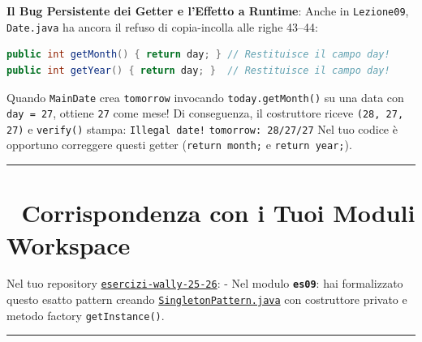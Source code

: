 \documentclass[11pt,a4paper,oneside]{report}
\newcommand{\passthrough}[1]{#1}
\begin{document}
\begin{studywarning} \textbf{Il Bug Persistente dei Getter e l'Effetto a
Runtime}: Anche in \passthrough{\lstinline!Lezione09!},
\passthrough{\lstinline!Date.java!} ha ancora il refuso di copia-incolla
alle righe 43--44:

\begin{lstlisting}[language=Java]
public int getMonth() { return day; } // Restituisce il campo day!
public int getYear() { return day; }  // Restituisce il campo day!
\end{lstlisting}

Quando \passthrough{\lstinline!MainDate!} crea
\passthrough{\lstinline!tomorrow!} invocando
\passthrough{\lstinline!today.getMonth()!} su una data con
\passthrough{\lstinline!day = 27!}, ottiene \passthrough{\lstinline!27!}
come mese! Di conseguenza, il costruttore riceve
\passthrough{\lstinline!(28, 27, 27)!} e
\passthrough{\lstinline!verify()!} stampa:
\passthrough{\lstinline"Illegal date!"}
\passthrough{\lstinline!tomorrow: 28/27/27!} Nel tuo codice è opportuno
correggere questi getter (\passthrough{\lstinline!return month;!} e
\passthrough{\lstinline!return year;!}).
\end{studywarning}

\begin{center}\rule{0.5\linewidth}{0.5pt}\end{center}

\section{🔄 Corrispondenza con i Tuoi Moduli
Workspace}\label{chap08_corrispondenza-con-i-tuoi-moduli-workspace}

Nel tuo repository
\href{file:///home/wally/Documenti/GitHub/Programmazione-II/25-26/esercizi-wally-25-26}{\passthrough{\lstinline!esercizi-wally-25-26!}}:
- Nel modulo \textbf{\passthrough{\lstinline!es09!}}: hai formalizzato
questo esatto pattern creando
\href{file:///home/wally/Documenti/GitHub/Programmazione-II/25-26/esercizi-wally-25-26/es09/src/main/java/es09/SingletonPattern.java}{\passthrough{\lstinline!SingletonPattern.java!}}
con costruttore privato e metodo factory
\passthrough{\lstinline!getInstance()!}.

\begin{center}\rule{0.5\linewidth}{0.5pt}\end{center}
\end{document}
